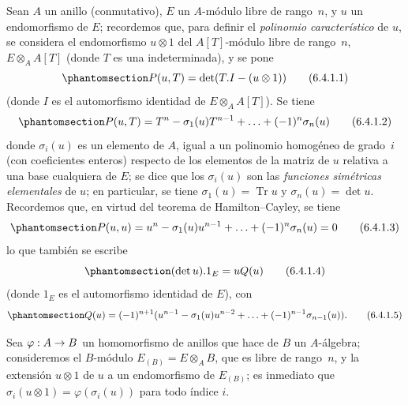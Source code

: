 \documentclass[oneside,10pt]{amsart}
\makeatletter
\newcommand{\ega@arrow}[2]{\mathchoice{#1}{#2}{#2}{#2}}
\renewcommand{\to}{\ega@arrow{\longrightarrow}{\rightarrow}}
\newcommand{\oldpage}[2][]{\marginnote{\normalfont\footnotesize\textbf{#1}~|~#2}\ignorespaces}
\let\EGAOriginalLabel\label
\renewcommand{\label}[1]{\phantomsection\EGAOriginalLabel{#1}}
\makeatother
\begin{document}
\begin{env}[6.4.1]
\label{II.6.4.1-fr}
Sean $A$ un anillo (conmutativo), $E$ un $A$-módulo libre de rango~$n$, y $u$ un endomorfismo de $E$;
recordemos que, para definir el \emph{polinomio característico} de $u$, se considera el endomorfismo $u\otimes1$ del $A[T]$-módulo libre de rango~$n$, $E\otimes_AA[T]$ (donde $T$ es una indeterminada), y se pone
\[
\label{II.6.4.1.1-fr}
P(u,T)=\det(T.I-(u\otimes1))
\tag{6.4.1.1}
\]
(donde $I$ es el automorfismo identidad de $E\otimes_AA[T]$).
Se tiene
\[
\label{II.6.4.1.2-fr}
P(u,T)=T^n-\sigma_1(u)T^{n-1}+\ldots+(-1)^n\sigma_n(u)
\tag{6.4.1.2}
\]
donde $\sigma_i(u)$ es un elemento de $A$, igual a un polinomio homogéneo de grado~$i$ (con coeficientes enteros) respecto de los elementos de la matriz de $u$ relativa a una base cualquiera de $E$;
se dice que los $\sigma_i(u)$ son las \emph{funciones simétricas elementales} de $u$;
en particular, se tiene $\sigma_1(u)=\operatorname{Tr}u$ y $\sigma_n(u)=\det u$.
Recordemos que, en virtud del teorema de Hamilton--Cayley, se tiene
\[
\label{II.6.4.1.3-fr}
P(u,u)=u^n-\sigma_1(u)u^{n-1}+\ldots+(-1)^n\sigma_n(u)=0
\tag{6.4.1.3}
\]
\oldpage[II]{121}
lo que también se escribe
\[
\label{II.6.4.1.4-fr}
(\det u). 1_E=uQ(u)
\tag{6.4.1.4}
\]
(donde $1_E$ es el automorfismo identidad de $E$), con
\[
\label{II.6.4.1.5-fr}
Q(u)=(-1)^{n+1}(u^{n-1}-\sigma_1(u)u^{n-2}+\ldots+(-1)^{n-1}\sigma_{n-1}(u)).
\tag{6.4.1.5}
\]

Sea $\varphi:A\to B$ un homomorfismo de anillos que hace de $B$ un $A$-álgebra;
consideremos el $B$-módulo $E_{(B)}=E\otimes_AB$, que es libre de rango~$n$, y la extensión $u\otimes1$ de $u$ a un endomorfismo de $E_{(B)}$;
es inmediato que $\sigma_i(u\otimes1)=\varphi(\sigma_i(u))$ para todo índice $i$.
\end{env}
\end{document}
